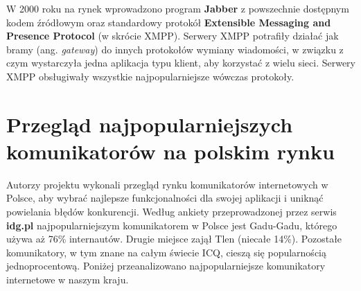 \documentclass[a4paper,12pt]{article}
\begin{document}
W 2000 roku na rynek wprowadzono program \textbf{Jabber} z powszechnie dostępnym kodem źródłowym oraz standardowy protokół \textbf{Extensible Messaging and Presence Protocol} (w skrócie XMPP). Serwery XMPP potrafiły działać jak bramy (ang. \textit{gateway}) do innych protokołów wymiany wiadomości, w związku z czym wystarczyła jedna aplikacja typu klient, aby korzystać z wielu sieci. Serwery XMPP obsługiwały wszystkie najpopularniejsze wówczas protokoły.


\section[Przegląd najpopularniejszych komunikatorów na polskim rynku]{Przegląd najpopularniejszych komunikatorów na polskim rynku}
Autorzy projektu wykonali przegląd rynku komunikatorów internetowych w Polsce, aby wybrać najlepsze funkcjonalności dla swojej aplikacji i uniknąć powielania błędów konkurencji.
Według ankiety przeprowadzonej przez serwis \textbf{idg.pl} \cite{ID} najpopularniejszym komunikatorem w Polsce jest Gadu-Gadu, którego używa aż 76\% internautów. Drugie miejsce zajął Tlen (niecałe 14\%). Pozostałe komunikatory, w tym znane na całym świecie ICQ, cieszą się popularnością jednoprocentową.
Poniżej przeanalizowano najpopularniejsze komunikatory internetowe w naszym kraju.
\end{document}
